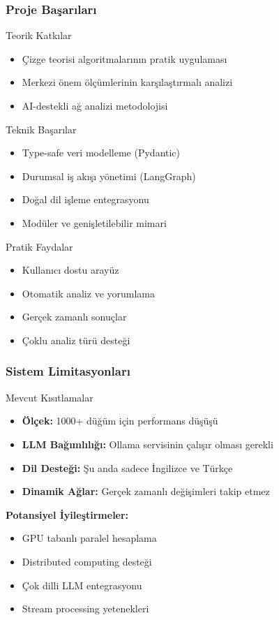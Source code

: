 \documentclass[aspectratio=169]{beamer}
\begin{document}
\begin{frame}
\frametitle{Proje Başarıları}
\begin{block}{Teorik Katkılar}
\begin{itemize}
    \item Çizge teorisi algoritmalarının pratik uygulaması
    \item Merkezi önem ölçümlerinin karşılaştırmalı analizi
    \item AI-destekli ağ analizi metodolojisi
\end{itemize}
\end{block}

\begin{block}{Teknik Başarılar}
\begin{itemize}
    \item Type-safe veri modelleme (Pydantic)
    \item Durumsal iş akışı yönetimi (LangGraph)
    \item Doğal dil işleme entegrasyonu
    \item Modüler ve genişletilebilir mimari
\end{itemize}
\end{block}

\begin{block}{Pratik Faydalar}
\begin{itemize}
    \item Kullanıcı dostu arayüz
    \item Otomatik analiz ve yorumlama
    \item Gerçek zamanlı sonuçlar
    \item Çoklu analiz türü desteği
\end{itemize}
\end{block}
\end{frame}

\begin{frame}
\frametitle{Sistem Limitasyonları}
\begin{alertblock}{Mevcut Kısıtlamalar}
\begin{itemize}
    \item \textbf{Ölçek:} 1000+ düğüm için performans düşüşü
    \item \textbf{LLM Bağımlılığı:} Ollama servisinin çalışır olması gerekli
    \item \textbf{Dil Desteği:} Şu anda sadece İngilizce ve Türkçe
    \item \textbf{Dinamik Ağlar:} Gerçek zamanlı değişimleri takip etmez
\end{itemize}
\end{alertblock}

\vspace{0.3cm}
\textbf{Potansiyel İyileştirmeler:}
\begin{itemize}
    \item GPU tabanlı paralel hesaplama
    \item Distributed computing desteği
    \item Çok dilli LLM entegrasyonu
    \item Stream processing yetenekleri
\end{itemize}
\end{frame}
\end{document}
